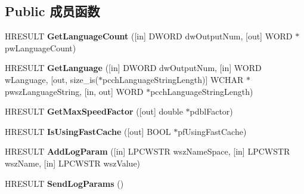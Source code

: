 \subsection*{Public 成员函数}
\begin{DoxyCompactItemize}
\item 
\mbox{\label{interface_i_w_m_reader_advanced4_ac6f28b9db3930dfa59f2dd9d3018c13c}} 
H\+R\+E\+S\+U\+LT {\bfseries Get\+Language\+Count} (\mbox{[}in\mbox{]} D\+W\+O\+RD dw\+Output\+Num, \mbox{[}out\mbox{]} W\+O\+RD $\ast$pw\+Language\+Count)
\item 
\mbox{\label{interface_i_w_m_reader_advanced4_aa3b2931f820f847ca8d952c96ceee156}} 
H\+R\+E\+S\+U\+LT {\bfseries Get\+Language} (\mbox{[}in\mbox{]} D\+W\+O\+RD dw\+Output\+Num, \mbox{[}in\mbox{]} W\+O\+RD w\+Language, \mbox{[}out, size\+\_\+is($\ast$pcch\+Language\+String\+Length)\mbox{]} W\+C\+H\+AR $\ast$pwsz\+Language\+String, \mbox{[}in, out\mbox{]} W\+O\+RD $\ast$pcch\+Language\+String\+Length)
\item 
\mbox{\label{interface_i_w_m_reader_advanced4_adad65ae087938fceff876693ca015b3b}} 
H\+R\+E\+S\+U\+LT {\bfseries Get\+Max\+Speed\+Factor} (\mbox{[}out\mbox{]} double $\ast$pdbl\+Factor)
\item 
\mbox{\label{interface_i_w_m_reader_advanced4_a7e6cc6744d313e372a31f0c4fde66c93}} 
H\+R\+E\+S\+U\+LT {\bfseries Is\+Using\+Fast\+Cache} (\mbox{[}out\mbox{]} B\+O\+OL $\ast$pf\+Using\+Fast\+Cache)
\item 
\mbox{\label{interface_i_w_m_reader_advanced4_aaaa1975235e8a691501f3c478dc6f3d6}} 
H\+R\+E\+S\+U\+LT {\bfseries Add\+Log\+Param} (\mbox{[}in\mbox{]} L\+P\+C\+W\+S\+TR wsz\+Name\+Space, \mbox{[}in\mbox{]} L\+P\+C\+W\+S\+TR wsz\+Name, \mbox{[}in\mbox{]} L\+P\+C\+W\+S\+TR wsz\+Value)
\item 
\mbox{\label{interface_i_w_m_reader_advanced4_a43f12488489d2a0c314a2b6d136dc4b3}} 
H\+R\+E\+S\+U\+LT {\bfseries Send\+Log\+Params} ()
\item 
\mbox{\label{interface_i_w_m_reader_advanced4_ac063001c69d032fba813d8fae658f073}} 

\end{DoxyCompactItemize}
